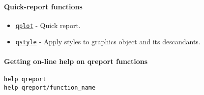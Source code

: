 

	\paragraph{Quick-report functions}

\begin{itemize}
\itemsep1pt\parskip0pt
\item
  \href{qreport/qplot}{\texttt{qplot}} - Quick report.
\item
  \href{qreport/qstyle}{\texttt{qstyle}} - Apply styles to graphics
  object and its descandants.
\end{itemize}

\paragraph{Getting on-line help on qreport
functions}

\begin{verbatim}
help qreport
help qreport/function_name
\end{verbatim}



